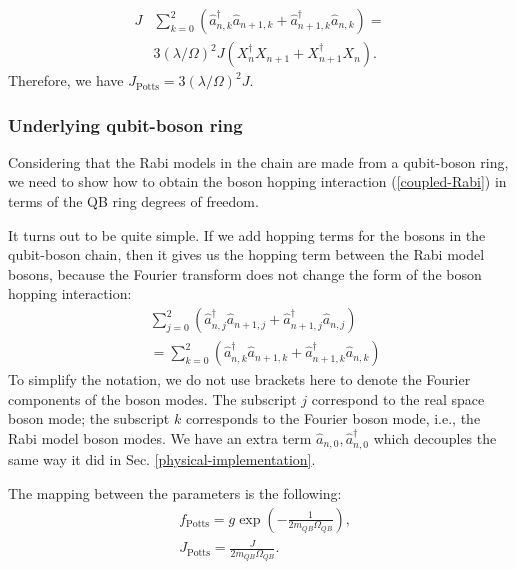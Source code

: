 \documentclass[reprint, aps, prx, amsmath, amssymb, longbibliography, superscriptaddress]{revtex4-2}
\DeclareMathOperator{\Zthree}{\mathbb{Z}_3}
\begin{document}
\begin{equation}
\begin{aligned}
    J &\sum\limits_{k=0}^{2} \left(\hat a_{n,k}^{\dagger} \hat a_{n+1,k} + \hat a_{n+1,k}^{\dagger} \hat a_{n,k}\right) = \\
    &3(\lambda/\Omega)^2 J\left(X_n^{\dagger} X_{n+1} + X_{n+1}^{\dagger} X_n\right).
\end{aligned}
\end{equation}
Therefore, we have $J_{\text{Potts}} = 3(\lambda/\Omega)^2 J$.


\subsubsection{Underlying qubit-boson ring}

Considering that the Rabi models in the chain are made from a qubit-boson ring, we need to show how to obtain the boson hopping interaction (\ref{coupled-Rabi}) in terms of the QB ring degrees of freedom.

It turns out to be quite simple. If we add hopping terms for the bosons in the qubit-boson chain, then it gives us the hopping term between the Rabi model bosons, because the Fourier transform does not change the form of the boson hopping interaction:
\begin{equation}
\begin{aligned}
    &\sum\limits_{j=0}^2 \left(\hat a_{n,j}^{\dagger} \hat a_{n+1,j} + \hat a_{n+1,j}^{\dagger} \hat a_{n,j}\right) \\
    &=\sum\limits_{k=0}^{2} \left(\hat a_{n,k}^{\dagger} \hat a_{n+1,k} + \hat a_{n+1,k}^{\dagger} \hat a_{n,k}\right)
\end{aligned}
\end{equation}
To simplify the notation, we do not use brackets here to denote the Fourier components of the boson modes. The subscript $j$ correspond to the real space boson mode; the subscript $k$ corresponds to the Fourier boson mode, i.e., the $\Zthree$ Rabi model boson modes. We have an extra term $\hat a_{n,0}, \hat a^{\dagger}_{n,0}$ which decouples the same way it did in Sec. \ref{physical-implementation}.

The mapping between the parameters is the following:
\begin{equation}
\begin{aligned}
    &f_{\text{Potts}} = g \exp\left(-\frac{1}{2 m_{QB} \Omega_{QB}}\right),\\
    &J_{\text{Potts}} = \frac{J }{2 m_{QB} \Omega_{QB}} .
\end{aligned}
\end{equation}
\end{document}
